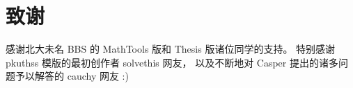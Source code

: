 
\chapter{致谢}

感谢北大未名 BBS 的 MathTools 版和 Thesis 版诸位同学的支持。
特别感谢 pkuthss 模版的最初创作者 solvethis 网友，
以及不断地对 Casper 提出的诸多问题予以解答的 cauchy 网友 :)

